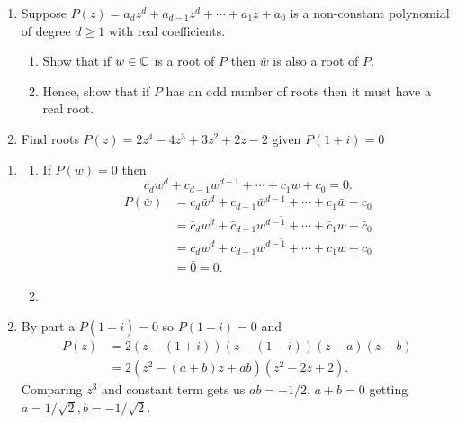 \documentclass[10pt, a4paper]{article}
\begin{document}
\begin{problem}\phantom{}
    \begin{enumerate}[label = (\alph*)]
        \item Suppose $P(z) = a_dz ^ d + a_{d - 1}z ^ d + \dotsi + a_1z + a_0$ is a non-constant polynomial of degree $d \geq 1$ with real coefficients.

        \begin{enumerate}[label = (\roman*)]
            \item Show that if $w \in \mathbb{C}$ is a root of $P$ then $\bar{w}$ is also a root of $P$.

            \item Hence,
            show that if $P$ has an odd number of roots then it must have a real root.
        \end{enumerate}

        \item Find roots $P(z) = 2z ^ 4 - 4z ^ 3 + 3z ^ 2 + 2z - 2$ given $P(1 + i) = 0$
    \end{enumerate}

    \begin{solution}\phantom{}
        \begin{enumerate}[label = (\alph*)]
            \item
            \begin{enumerate}[label = (\roman*)]
                \item If $P(w) = 0$ then
                \[
                c_dw ^ d + c_{d - 1}w ^ {d - 1} + \dotsi + c_1w + c_0 = 0.
                \]
                \begin{align*}
                    P(\bar{w}) &= c_d\bar{w} ^ d + c_{d - 1}\bar{w} ^ {d - 1} + \dotsi + c_1\bar{w} + c_0 \\
                    &= \overline{\bar{c}_dw ^ d + \bar{c}_{d - 1}w ^ {d - 1} + \dotsi + \bar{c}_1w + \bar{c}_0} \\
                    &= \overline{c_dw ^ d + c_{d - 1}w ^ {d - 1} + \dotsi + c_1w + c_0} \\
                    &= \bar{0} = 0.
                \end{align*}

                \item 
            \end{enumerate}

            \item By part a $P(\overline{1 + i}) = 0$ so $P(1 - i) = 0$ and
            \begin{align*}
                P(z) &= 2(z - (1 + i))(z - (1 - i))(z - a)(z - b) \\
                &= 2(z ^ 2 - (a + b)z + ab)(z ^ 2 - 2z + 2).
            \end{align*}
            Comparing $z ^ 3$ and constant term gets us $ab = -1 / 2$,
            $a + b = 0$ getting $a = 1 / \sqrt{2}, b = -1 / \sqrt{2}$.
        \end{enumerate}
    \end{solution}
\end{problem}
\end{document}
